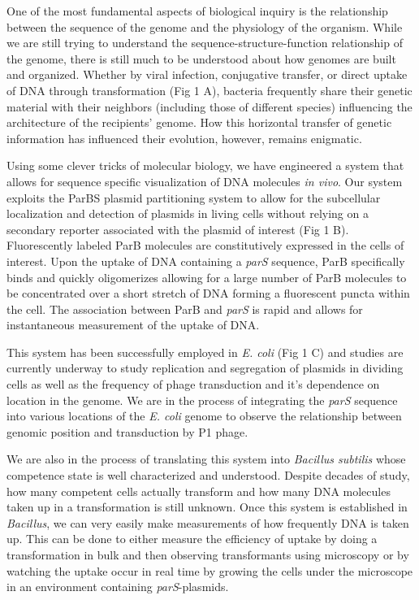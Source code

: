 \documentclass[letterpaper]{article}
\begin{document}
One of the most fundamental aspects of biological inquiry is the relationship
between the sequence of the genome and the physiology of the organism. While we
are still trying to understand the sequence-structure-function relationship of
the genome, there is still much to be understood about how genomes are built and
organized. Whether by viral infection, conjugative transfer, or direct uptake of DNA
through transformation (Fig 1 A), bacteria frequently share their genetic material with
their neighbors (including those of different species) influencing the
architecture of the recipients' genome. How this horizontal transfer
of genetic information has influenced their evolution, however, remains enigmatic.

Using some
clever tricks of molecular biology, we have engineered a system that allows for
sequence specific visualization of DNA molecules \textit{in vivo}. Our system
exploits the ParBS plasmid partitioning system to allow for the subcellular
localization and detection of plasmids in living cells without relying on a
secondary reporter associated with the plasmid of interest (Fig 1 B).
Fluorescently labeled ParB molecules are constitutively expressed in the cells
of interest. Upon the uptake of DNA containing a \textit{parS} sequence, ParB
specifically binds and quickly oligomerizes allowing for a large number of ParB
molecules to be concentrated over a short stretch of DNA forming a fluorescent
puncta within the cell. The association
between ParB and \textit{parS} is rapid  and allows for instantaneous
measurement of the uptake of DNA.

This system has been successfully employed in \textit{E. coli} (Fig 1 C) and studies
are currently underway to study replication and segregation of plasmids in
dividing cells as well as the frequency of phage transduction and it's
dependence on location in the genome. We are in the process of integrating the
\textit{parS} sequence into various locations of the \textit{E. coli} genome to
observe the relationship between genomic position and transduction by P1 phage.


We are also in the
process of translating this system into \textit{Bacillus subtilis} whose
competence state is well characterized and understood. Despite decades of study, how many
competent cells actually transform and how many DNA molecules taken up in a
transformation is still unknown. Once this system is established in
\textit{Bacillus},
we can very easily make measurements of how frequently DNA is taken up. This can
be done to either measure the efficiency of uptake by doing a transformation in
bulk and then observing transformants using microscopy or by watching the uptake
occur in real time by growing the cells under the microscope in an environment
containing \textit{parS}-plasmids.
\end{document}
